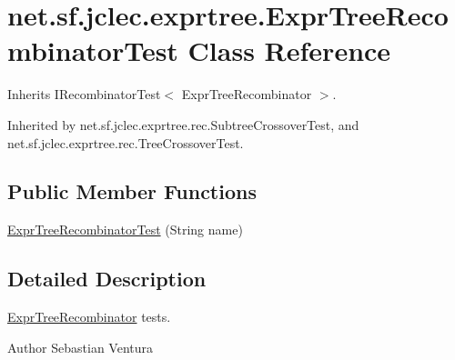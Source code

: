 \hypertarget{classnet_1_1sf_1_1jclec_1_1exprtree_1_1_expr_tree_recombinator_test}{\section{net.\-sf.\-jclec.\-exprtree.\-Expr\-Tree\-Recombinator\-Test Class Reference}
\label{classnet_1_1sf_1_1jclec_1_1exprtree_1_1_expr_tree_recombinator_test}
}


Inherits I\-Recombinator\-Test$<$ Expr\-Tree\-Recombinator $>$.



Inherited by net.\-sf.\-jclec.\-exprtree.\-rec.\-Subtree\-Crossover\-Test, and net.\-sf.\-jclec.\-exprtree.\-rec.\-Tree\-Crossover\-Test.

\subsection*{Public Member Functions}
\begin{DoxyCompactItemize}
\item 
\hyperlink{classnet_1_1sf_1_1jclec_1_1exprtree_1_1_expr_tree_recombinator_test_a4edb88503edd4f56b5d9c51e913e0889}{Expr\-Tree\-Recombinator\-Test} (String name)
\end{DoxyCompactItemize}


\subsection{Detailed Description}
\hyperlink{classnet_1_1sf_1_1jclec_1_1exprtree_1_1_expr_tree_recombinator}{Expr\-Tree\-Recombinator} tests.

\begin{DoxyAuthor}{Author}
Sebastian Ventura 
\end{DoxyAuthor}


